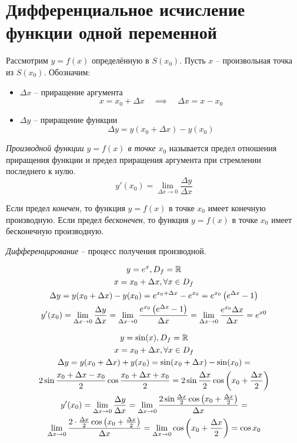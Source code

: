 \section{Дифференциальное исчисление функции одной переменной}

Рассмотрим $y=f(x)$ определённую в $S(x_0)$. Пусть $x$ -- произвольная точка из $S(x_0)$.
Обозначим:
\begin{itemize}
  \item $\Delta x$ -- приращение аргумента \[
    x = x_0 + \Delta x \quad \implies \quad \Delta x = x - x_0
  \]
  \item $\Delta y$ -- приращение функции \[
    \Delta y = y(x_0 + \Delta x) - y(x_0)
  \] 
\end{itemize}

\begin{definition}
  \textit{Производной функции $y = f(x)$ в точке $x_0$ } называется предел отношения приращения функции и предел приращения аргумента при стремлении последнего к нулю. \[
  y'(x_0) = \lim_{\Delta x \to 0} \frac{\Delta y}{\Delta x}
  \] 
\end{definition}

Если предел \textit{конечен}, то функция $y=f(x)$ в точке $x_0$ имеет конечную производную.
Если предел \textit{бесконечен}, то функция $y=f(x)$ в точке $x_0$ имеет бесконечную производную.

\textit{Дифференцирование} -- процесс получения производной.

\begin{eg}
  \begin{gather*}
    y = e^x, D_f = \R \\
    x = x_0 + \Delta x, \forall x \in D_f \\
\Delta  y = y(x_0 + \Delta x) - y(x_0) = e^{x_0 + \Delta x} - e^{x_0} = e^{x_0} \left(e^{\Delta x} - 1\right) \\
y'(x_0) = \lim_{\Delta x \to 0} \frac{\Delta y}{\Delta x} = \lim_{\Delta x \to 0} \frac{e^{x_0} \left( e^{\Delta x} - 1 \right) }{\Delta x} = \lim_{\Delta x \to 0} \frac{e^{x_0} \Delta x}{\Delta x} = e^{x0}
  \end{gather*}
\end{eg}
\begin{eg}
  \begin{gather*}
    y = \sin(x), D_f = \R \\
    x = x_0 + \Delta x, \forall x \in D_f \\
  \Delta y = y(x_0 + \Delta x) + y(x_0) = \sin(x_0 + \Delta x) - \sin(x_0) = \\
  2\sin \frac{x_0 + \Delta x - x_0}{2} \cos \frac{x_0 + \Delta x + x_0}{2} = 2\sin \frac{\Delta x}{2} \cos \left(x_0 + \frac{\Delta x}{2}\right) \\
  y'(x_0) = \lim_{\Delta x \to 0} \frac{\Delta y}{\Delta x} = \lim_{\Delta x \to 0} \frac{2\sin \frac{\Delta x}{2} \cos \left( x_0 + \frac{\Delta x}{2} \right) }{\Delta x} = \\
  \lim_{\Delta x \to 0} \frac{2 \cdot \frac{\Delta x}{2} \cos\left( x_0 + \frac{\Delta x}{2} \right) }{\Delta x} = \lim_{\Delta x \to 0} \cos\left( x_0 + \frac{\Delta x}{2} \right) = \cos x_0
  \end{gather*}
\end{eg}

